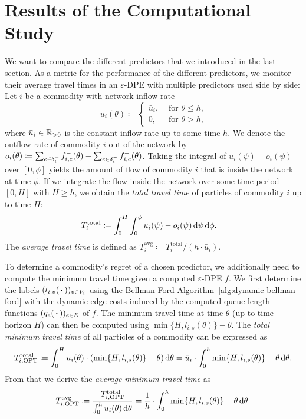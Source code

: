 \section{Results of the Computational Study}\label{sec:results}

We want to compare the different predictors that we introduced in the last section.
As a metric for the performance of the different predictors, we monitor their average travel times in an $\varepsilon$-DPE with multiple predictors used side by side:
Let $i$ be a commodity with network inflow rate
\[
    u_i(\theta) \coloneqq \begin{cases}
        \bar{u}_i, &\text{ for $\theta \leq h$,}\\
        0, &\text{ for $\theta > h$,}
    \end{cases}
\]
where $\bar{u}_i\in\mathbb{R}_{>0}$ is the constant inflow rate up to some time $h$. 
We denote the outflow rate of commodity $i$ out of the network by  $o_i(\theta) \coloneqq \sum_{e\in\delta^+_{t}} f_{i,e}^-(\theta) - \sum_{e\in\delta^-_{t}} f_{i,e}^+(\theta)$.
Taking the integral of $u_i(\psi) - o_i(\psi)$ over $[0, \phi]$ yields the amount of flow of commodity $i$ that is inside the network at time $\phi$.
If we integrate the flow inside the network over some time period $[0, H]$ with $H \geq h$, we obtain the \emph{total travel time} of particles of commodity $i$ up to time $H$:
\begin{align*}
    T^{\text{total}}_i
    &\coloneqq\int_0^H \int_0^\phi u_i(\psi) - o_{i}(\psi) \,\textnormal{d}\psi \,\textnormal{d} \phi.
\end{align*}
The \emph{average travel time} is defined as $T^{\text{avg}}_i\coloneqq  T_i^{\text{total}} / (h\cdot \bar{u}_i)$.

To determine a commodity's regret of a chosen predictor, we additionally need to compute the minimum travel time given a computed $\varepsilon$-DPE $f$.
We first determine the labels $(l_{i,v}(\,\boldsymbol{\cdot}\,))_{v\in V_i}$ using the Bellman-Ford-Algorithm~\ref{alg:dynamic-bellman-ford} with the dynamic edge costs induced by the computed queue length functions $(q_e(\,\boldsymbol{\cdot}\,))_{e\in E}$ of $f$.
The minimum travel time at time $\theta$ (up to time horizon $H$) can then be computed using $\min\{H, l_{i,s}(\theta)\} - \theta$.
The \emph{total minimum travel time} of all particles of a commodity can be expressed as
\[
    T^{\mathrm{total}}_{i, \text{OPT}}
    \coloneqq \int_0^H u_i(\theta)\cdot (\min\{H, l_{i,s}(\theta)\} - \theta) \,\textnormal{d} \theta
    = \bar u_i \cdot \int_0^h \min\{H, l_{i,s}(\theta)\} - \theta \,\textnormal{d} \theta.
\]
From that we derive the \emph{average minimum travel time} as
\[
    T^{\mathrm{avg}}_{i, \text{OPT}}
    \coloneqq \frac{T^{\mathrm{total}}_{i, \text{OPT}}}{\int_0^h u_i(\theta)\,\textnormal{d} \theta} = \frac{1}{h}\cdot \int_0^h \min\{H, l_{i,s}(\theta)\} - \theta \,\textnormal{d} \theta.
\]

